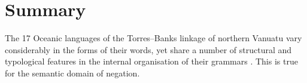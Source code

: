 \documentclass[output=paper,colorlinks,citecolor=brown,draft]{langscibook}
\begin{document}
\section{Summary}\label{sec:dor:5.3}

The 17 Oceanic languages of the Torres–Banks linkage of northern Vanuatu vary considerably in the forms of their words, yet share a number of structural and typo\-logi\-cal features in the internal organisation of their grammars \citep{François2011}. This is true for the semantic domain of negation.
\end{document}
